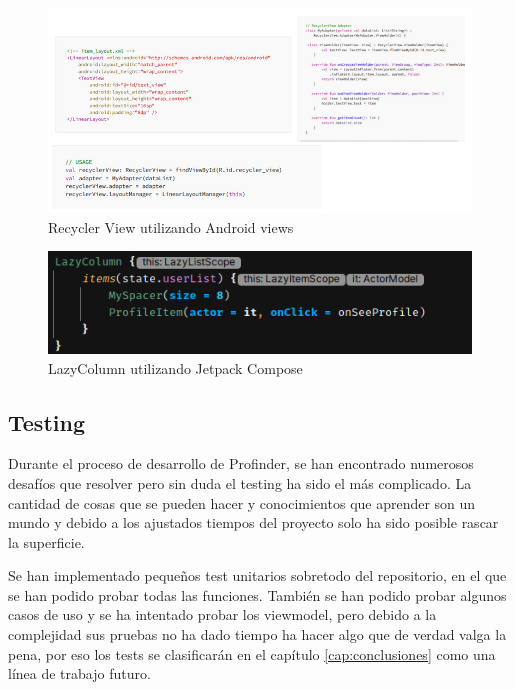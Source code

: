 \begin{figure}[h]
	\centering
	\includegraphics[width = 1\textwidth]{Imagenes/Fuentes/views_demo.png}
	\caption{Recycler View utilizando Android views \citep{RecyclerVsLazy}}
	\label{fig:views_demo}
\end{figure}
\newpage
\begin{figure}[h]
	\centering
	\includegraphics[width = 1\textwidth]{Imagenes/Fuentes/compose_demo.png}
	\caption{LazyColumn utilizando Jetpack Compose}
	\label{fig:compose_demo}
\end{figure}

\subsection{Testing}
Durante el proceso de desarrollo de Profinder, se han encontrado numerosos desafíos que resolver pero sin duda el testing ha sido el más complicado. La cantidad de cosas que se pueden hacer y conocimientos que aprender son un mundo y debido a los ajustados tiempos del proyecto solo ha sido posible rascar la superficie.

Se han implementado pequeños test unitarios sobretodo del repositorio, en el que se han podido probar todas las funciones. También se han podido probar algunos casos de uso y se ha intentado probar los viewmodel, pero debido a la complejidad sus pruebas no ha dado tiempo ha hacer algo que de verdad valga la pena, por eso los tests se clasificarán en el capítulo \ref{cap:conclusiones} como una línea de trabajo futuro.

